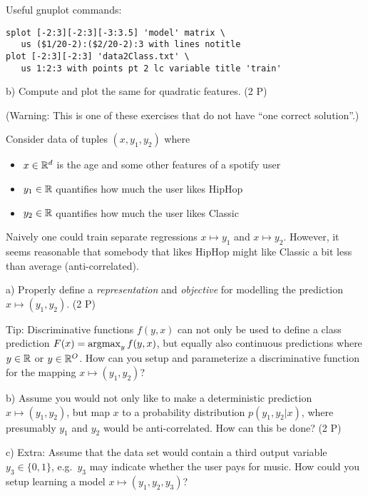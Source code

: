 Useful gnuplot commands:

\begin{code}%
\begin{verbatim}
splot [-2:3][-2:3][-3:3.5] 'model' matrix \
   us ($1/20-2):($2/20-2):3 with lines notitle
plot [-2:3][-2:3] 'data2Class.txt' \
   us 1:2:3 with points pt 2 lc variable title 'train'
\end{verbatim}
\end{code}


b) Compute and plot the same for quadratic features. (2 P)


\exsection{Structured Output (4 Points)}

(Warning: This is one of these exercises that do not have ``one correct solution''.)

Consider data of tuples $(x,y_1,y_2)$ where
\begin{itemize}
\item $x\in{\mathbb{R}}^d$ is the age and some other features of a spotify user
\item $y_1\in{\mathbb{R}}$ quantifies how much the user likes
  HipHop
\item $y_2\in{\mathbb{R}}$ quantifies how much the user likes
  Classic
\end{itemize}
Naively one could train separate regressions $x\mapsto y_1$ and
$x\mapsto y_2$. However, it seems reasonable that somebody that likes
HipHop might like Classic a bit less than average (anti-correlated).

a) Properly define a \emph{representation} and \emph{objective} for
modelling the prediction $x \mapsto (y_1, y_2)$. (2 P)

Tip: Discriminative functions $f(y,x)$ can not only be used to define a class prediction $F(x) = \operatorname*{argmax}_y f(y,x)$, but equally also continuous predictions where $y\in{\mathbb{R}}$ or $y\in{\mathbb{R}}^O$. How can you setup and parameterize a discriminative function for the mapping $x \mapsto (y_1, y_2)$?

b) Assume you would not only like to make a deterministic prediction $x \mapsto (y_1, y_2)$, but map $x$ to a probability distribution $p(y_1,y_2|x)$, where presumably $y_1$ and $y_2$ would be anti-correlated. How can this be done? (2 P)

c) Extra: Assume that the data set would contain a third output variable $y_3\in\{0,1\}$, e.g.\ $y_3$ may indicate whether the user pays for music. How could you setup learning a model $x \mapsto (y_1, y_2, y_3)$?

